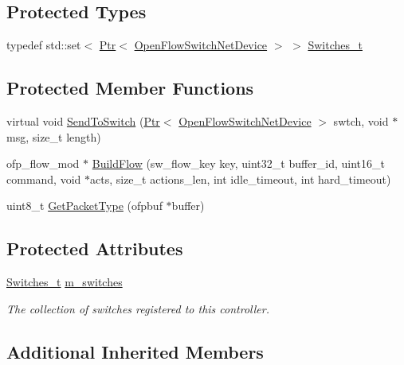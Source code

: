 \subsection*{Protected Types}
\begin{DoxyCompactItemize}
\item 
typedef std\+::set$<$ \hyperlink{classns3_1_1Ptr}{Ptr}$<$ \hyperlink{classns3_1_1OpenFlowSwitchNetDevice}{Open\+Flow\+Switch\+Net\+Device} $>$ $>$ \hyperlink{classns3_1_1ofi_1_1Controller_ab1abb4b29fa56439e309e12791bb4d88}{Switches\+\_\+t}
\end{DoxyCompactItemize}
\subsection*{Protected Member Functions}
\begin{DoxyCompactItemize}
\item 
virtual void \hyperlink{classns3_1_1ofi_1_1Controller_a727693553f4ed5c6bf726cfcafd2ec1a}{Send\+To\+Switch} (\hyperlink{classns3_1_1Ptr}{Ptr}$<$ \hyperlink{classns3_1_1OpenFlowSwitchNetDevice}{Open\+Flow\+Switch\+Net\+Device} $>$ swtch, void $\ast$msg, size\+\_\+t length)
\item 
ofp\+\_\+flow\+\_\+mod $\ast$ \hyperlink{classns3_1_1ofi_1_1Controller_a8a196a95993a3c989a573cd7237cbfcc}{Build\+Flow} (sw\+\_\+flow\+\_\+key key, uint32\+\_\+t buffer\+\_\+id, uint16\+\_\+t command, void $\ast$acts, size\+\_\+t actions\+\_\+len, int idle\+\_\+timeout, int hard\+\_\+timeout)
\item 
uint8\+\_\+t \hyperlink{classns3_1_1ofi_1_1Controller_a339b4111557bdaa16ad16e444c8ca2ca}{Get\+Packet\+Type} (ofpbuf $\ast$buffer)
\end{DoxyCompactItemize}
\subsection*{Protected Attributes}
\begin{DoxyCompactItemize}
\item 
\hyperlink{classns3_1_1ofi_1_1Controller_ab1abb4b29fa56439e309e12791bb4d88}{Switches\+\_\+t} \hyperlink{classns3_1_1ofi_1_1Controller_a44e6c7d999d43f70416d628b61df44d2}{m\+\_\+switches}
\begin{DoxyCompactList}\small\item\em The collection of switches registered to this controller. \end{DoxyCompactList}\end{DoxyCompactItemize}
\subsection*{Additional Inherited Members}


